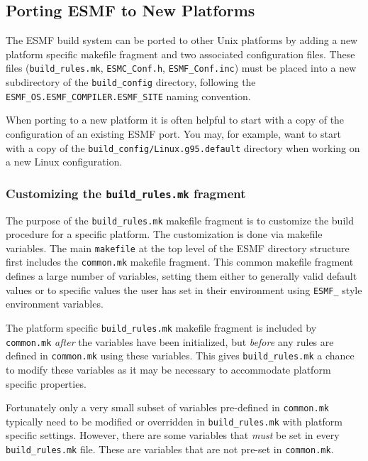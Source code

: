 \subsection{Porting ESMF to New Platforms}

The ESMF build system can be ported to other Unix platforms by adding a new
platform specific makefile fragment and two associated configuration files.
These files ({\tt build\_rules.mk}, {\tt ESMC\_Conf.h}, {\tt ESMF\_Conf.inc})
must be placed into a new subdirectory of the {\tt build\_config} directory,
following the {\tt ESMF\_OS.ESMF\_COMPILER.ESMF\_SITE} naming convention.

When porting to a new platform it is often helpful to start with a copy 
of the configuration of an existing ESMF port. You may, for example, want to
start with a copy of the {\tt build\_config/Linux.g95.default} directory when
working on a new Linux configuration.

\subsubsection{Customizing the {\tt build\_rules.mk} fragment}

The purpose of the {\tt build\_rules.mk} makefile fragment is to customize the
build procedure for a specific platform. The customization is done via makefile
variables. The main {\tt makefile} at the top level of the ESMF directory
structure first includes the {\tt common.mk} makefile fragment. This common
makefile fragment defines a large number of variables, setting them either to
generally valid default values or to specific values the user has set in their
environment using {\tt ESMF\_} style environment variables.

The platform specific {\tt build\_rules.mk} makefile fragment is included by
{\tt common.mk} {\em after} the variables have been initialized, but 
{\em before} any rules are defined in {\tt common.mk} using these variables.
This gives {\tt build\_rules.mk} a chance to modify these variables as it may
be necessary to accommodate platform specific properties.

Fortunately only a very small subset of variables pre-defined in {\tt common.mk}
typically need to be modified or overridden in {\tt build\_rules.mk} with 
platform specific settings. However, there are some variables that {\em must}
be set in every {\tt build\_rules.mk} file. These are variables that are not
pre-set in {\tt common.mk}.

